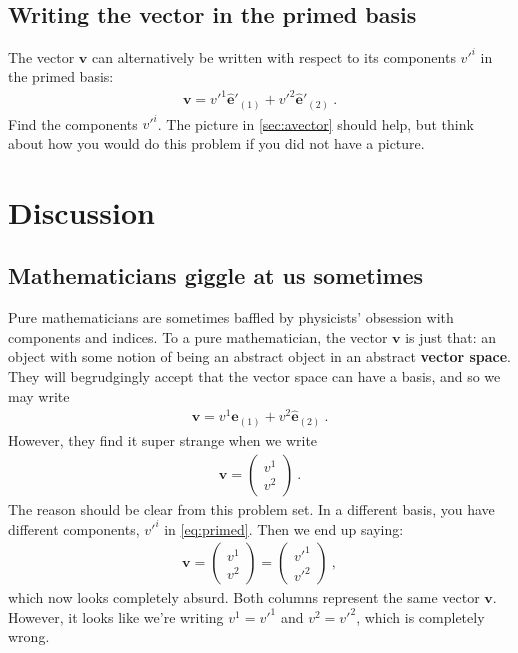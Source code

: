 \documentclass[12pt]{article}
\numberwithin{equation}{section}    %
\renewcommand{\vec}[1]{\mathbf{#1}} %
\begin{document}
\subsection{Writing the vector in the primed basis}

The vector $\vec{v}$ can alternatively be written with respect to its components $v'^i$ in the primed basis:
\begin{align}
	\vec{v} 
	= v'^1 \hat{\vec{e}}'_{(1)} + v'^2\hat{\vec{e}}'_{(2)}
	\ . \label{eq:primed}
\end{align}
Find the components $v'^i$. The picture in \ref{sec:avector} should help, but think about how you would do this problem if you did not have a picture.


\section*{Discussion}

\subsection*{Mathematicians giggle at us sometimes}

Pure mathematicians are sometimes baffled by physicists' obsession with components and indices. To a pure mathematician, the vector $\vec{v}$ is just that: an object with some notion of being an abstract object in an abstract \textbf{vector space}. They will begrudgingly accept that the vector space can have a basis, and so we may write
\begin{align}
	\vec{v} 
	= v^1 \hat{\vec{e}}_{(1)} + v^2\hat{\vec{e}}_{(2)}
	\ .
\end{align}
However, they find it super strange when we write
\begin{align}
	\vec{v} = 
	\begin{pmatrix}
		v^1\\
		v^2
	\end{pmatrix} \ .
\end{align}
The reason should be clear from this problem set. In a different basis, you have different components, $v'^i$ in \eqref{eq:primed}. Then we end up saying:
\begin{align}
	\vec{v} = 
	\begin{pmatrix}
		v^1\\
		v^2
	\end{pmatrix}
	=
	\begin{pmatrix}
		v'^1\\
		v'^2
	\end{pmatrix}
	 \ ,
\end{align}
which now looks completely absurd. Both columns represent the same vector $\vec{v}$. However, it looks like we're writing $v^1 = v'^1$ and $v^2 = v'^2$, which is completely wrong.
\end{document}
